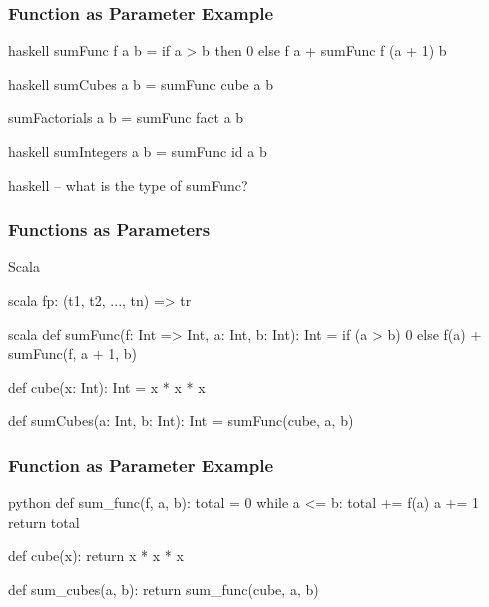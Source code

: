 \documentclass[dvipsnames]{beamer}
\theoremstyle{plain}
\begin{document}
\begin{frame}[fragile]
  \frametitle{Function as Parameter Example}

  \begin{example}[Haskell]
    \pause
    \begin{pygments}{haskell}
sumFunc f a b =
    if a > b then 0 else f a + sumFunc f (a + 1) b
    \end{pygments}

    \pause
    \bigskip
    \begin{pygments}{haskell}
sumCubes a b = sumFunc cube a b

sumFactorials a b = sumFunc fact a b
    \end{pygments}

    \pause
    \smallskip
    \begin{pygments}{haskell}
sumIntegers a b = sumFunc id a b
    \end{pygments}

    \pause
    \smallskip
    \begin{pygments}{haskell}
-- what is the type of sumFunc?
    \end{pygments}
  \end{example}
\end{frame}

\begin{frame}[fragile]
  \frametitle{Functions as Parameters}

  \begin{block}{Scala}
    \begin{pygments}{scala}
      fp: (t1, t2, ..., tn) => tr
    \end{pygments}
  \end{block}

  \pause
  \begin{example}[Scala]
    \pause
    \begin{pygments}{scala}
def sumFunc(f: Int => Int, a: Int, b: Int): Int =
    if (a > b) 0
    else f(a) + sumFunc(f, a + 1, b)

def cube(x: Int): Int = x * x * x

def sumCubes(a: Int, b: Int): Int = sumFunc(cube, a, b)
    \end{pygments}
  \end{example}
\end{frame}

\begin{frame}[fragile]
  \frametitle{Function as Parameter Example}

  \begin{example}[Python]
    \begin{pygments}{python}
def sum_func(f, a, b):
    total = 0
    while a <= b:
        total += f(a)
        a += 1
    return total

def cube(x):
    return x * x * x

def sum_cubes(a, b):
    return sum_func(cube, a, b)
    \end{pygments}
  \end{example}
\end{frame}
\end{document}
